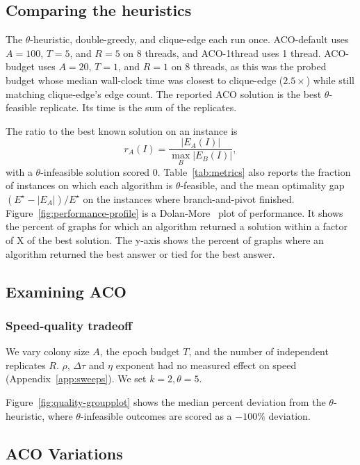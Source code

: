 \documentclass[conference]{IEEEtran}
\begin{document}
\subsection{Comparing the heuristics}

The $\theta$-heuristic, double-greedy, and clique-edge each run once. ACO-default uses $A = 100$, $T = 5$, and $R = 5$ on 8 threads, and ACO-1thread uses 1 thread. ACO-budget uses $A = 20$, $T = 1$, and $R = 1$ on 8 threads, as this was the probed budget whose median wall-clock time was closest to clique-edge ($2.5\times$) while still matching clique-edge's edge count. The reported ACO solution is the best $\theta$-feasible replicate. Its time is the sum of the replicates.

The ratio to the best known solution on an instance is
\[
r_A(I) = \frac{|E_A(I)|}{\max_B |E_B(I)|},
\]
with a $\theta$-infeasible solution scored $0$. Table~\ref{tab:metrics} also reports the fraction of instances on which each algorithm is $\theta$-feasible, and the mean optimality gap $(E^\star - |E_A|)/E^\star$ on the instances where branch-and-pivot finished. Figure~\ref{fig:performance-profile} is a Dolan-More~\cite{dolan-more} plot of performance. It shows the percent of graphs for which an algorithm returned a solution within a factor of X of the best solution. The y-axis shows the percent of graphs where an algorithm returned the best answer or tied for the best answer.


\subsection{Examining ACO}

\subsubsection{Speed-quality tradeoff}

We vary colony size $A$, the epoch budget $T$, and the number of independent replicates $R$. $\rho$, $\Delta\tau$ and $\eta$ exponent had no measured effect on speed (Appendix~\ref{app:sweeps}). We set $k = 2, \theta = 5$.

Figure~\ref{fig:quality-groupplot} shows the median percent deviation from the $\theta$-heuristic, where $\theta$-infeasible outcomes are scored as a $-100\%$ deviation.


\subsection{ACO Variations}
\end{document}
